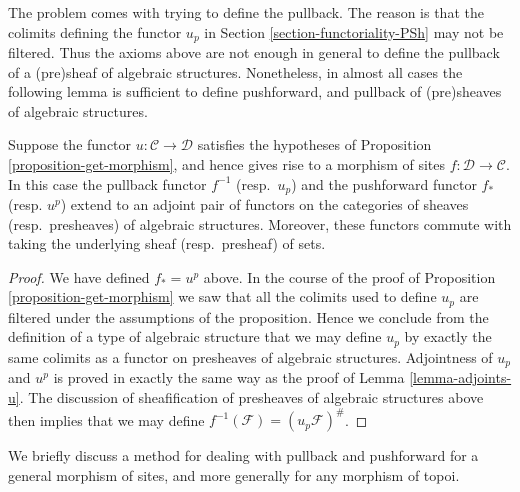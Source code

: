 \noindent
The problem comes with trying to define the pullback.
The reason is that the colimits defining
the functor $u_p$ in Section \ref{section-functoriality-PSh}
may not be filtered. Thus the axioms above are not enough in
general to define the pullback of a (pre)sheaf of algebraic
structures. Nonetheless, in almost all cases the following
lemma is sufficient to define pushforward, and pullback
of (pre)sheaves of algebraic structures.

\begin{lemma}
\label{lemma-push-pull-good-case}
Suppose the functor $u : \mathcal{C} \to \mathcal{D}$ satisfies
the hypotheses of Proposition \ref{proposition-get-morphism},
and hence gives rise to a morphism of sites
$f : \mathcal{D} \to \mathcal{C}$. In this case
the pullback functor $f^{-1}$ (resp.\ $u_p$) and the pushforward
functor $f_*$ (resp. $u^p$) extend to an adjoint pair of functors on
the categories of sheaves (resp.\ presheaves)  of algebraic structures.
Moreover, these functors commute with taking
the underlying sheaf (resp.\ presheaf) of sets.
\end{lemma}

\begin{proof}
We have defined $f_* = u^p$ above.
In the course of the proof of Proposition \ref{proposition-get-morphism}
we saw that all the colimits used to define $u_p$ are
filtered under the assumptions of the proposition.
Hence we conclude from the definition of a type of
algebraic structure that we may define $u_p$ by exactly
the same colimits as a functor on presheaves of algebraic structures.
Adjointness of $u_p$ and $u^p$ is proved in exactly the
same way as the proof of Lemma \ref{lemma-adjoints-u}.
The discussion of sheafification of presheaves of
algebraic structures above then implies that we may define
$f^{-1}(\mathcal{F}) = (u_p\mathcal{F})^\#$.
\end{proof}

\noindent
We briefly discuss a method for dealing with pullback and
pushforward for a general morphism of sites, and more generally
for any morphism of topoi.

